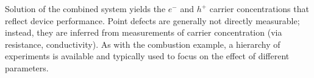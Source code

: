 \documentclass[11pt]{article}
\begin{document}


  Solution of the combined system yields the $e^-$ and
  $h^+$ carrier concentrations that reflect device
  performance. Point defects are generally not directly measurable;
  instead, they are inferred from measurements of carrier
  concentration (via resistance, conductivity). As with the combustion
  example, a hierarchy of experiments is available and typically used
  to focus on the effect of different parameters.


\end{document}
